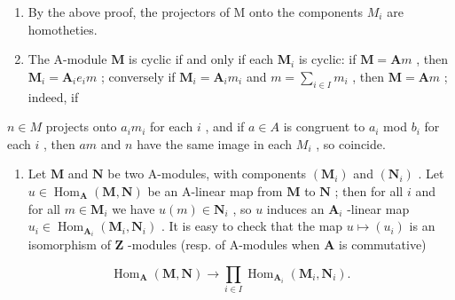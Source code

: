 \begin{enumerate}
\def\labelenumi{\arabic{enumi})}
\setcounter{enumi}{1}
\item
  By the above proof, the projectors of M onto the components \(M_{i}\) are homotheties.
\item
  The A-module \(\mathbf{M}\) is cyclic if and only if each \(\mathbf{M}_i\) is cyclic: if \(\mathbf{M} = \mathbf{A}m\) , then \(\mathbf{M}_i = \mathbf{A}_i e_i m\) ; conversely if \(\mathbf{M}_i = \mathbf{A}_i m_i\) and \(m = \sum_{i \in I} m_i\) , then \(\mathbf{M} = \mathbf{A}m\) ; indeed, if
\end{enumerate}

\(n \in M\) projects onto \(a_i m_i\) for each \(i\) , and if \(a \in A\) is congruent to \(a_i\) mod \(b_i\) for each \(i\) , then \(am\) and \(n\) have the same image in each \(M_i\) , so coincide.

\begin{enumerate}
\def\labelenumi{\arabic{enumi})}
\setcounter{enumi}{3}
\tightlist
\item
  Let \(\mathbf{M}\) and \(\mathbf{N}\) be two A-modules, with components \((\mathbf{M}_i)\) and \((\mathbf{N}_i)\) . Let \(u \in \operatorname{Hom}_{\mathbf{A}}(\mathbf{M}, \mathbf{N})\) be an A-linear map from \(\mathbf{M}\) to \(\mathbf{N}\) ; then for all \(i\) and for all \(m \in \mathbf{M}_i\) we have \(u(m) \in \mathbf{N}_i\) , so \(u\) induces an \(\mathbf{A}_i\) -linear map \(u_i \in \operatorname{Hom}_{\mathbf{A}_i}(\mathbf{M}_i, \mathbf{N}_i)\) . It is easy to check that the map \(u \mapsto (u_i)\) is an isomorphism of \(\mathbf{Z}\) -modules (resp. of A-modules when \(\mathbf{A}\) is commutative)
\end{enumerate}

\[
\operatorname{Hom} _ {\mathbf {A}} (\mathbf {M}, \mathbf {N}) \rightarrow \prod_ {i \in I} \operatorname{Hom} _ {\mathbf {A} _ {i}} (\mathbf {M} _ {i}, \mathbf {N} _ {i}).
\]

